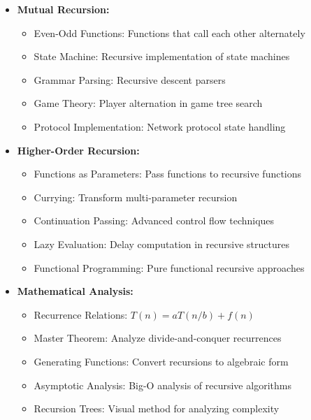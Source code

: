 \documentclass[a4paper,10pt]{book}
\begin{document}
\begin{itemize}[leftmargin=*]
    \item \textbf{Mutual Recursion:}
    \begin{itemize}
        \item Even-Odd Functions: Functions that call each other alternately
        \item State Machine: Recursive implementation of state machines
        \item Grammar Parsing: Recursive descent parsers
        \item Game Theory: Player alternation in game tree search
        \item Protocol Implementation: Network protocol state handling
    \end{itemize}

    \item \textbf{Higher-Order Recursion:}
    \begin{itemize}
        \item Functions as Parameters: Pass functions to recursive functions
        \item Currying: Transform multi-parameter recursion
        \item Continuation Passing: Advanced control flow techniques
        \item Lazy Evaluation: Delay computation in recursive structures
        \item Functional Programming: Pure functional recursive approaches
    \end{itemize}

    \item \textbf{Mathematical Analysis:}
    \begin{itemize}
        \item Recurrence Relations: $T(n)=aT(n/b)+f(n)$
        \item Master Theorem: Analyze divide-and-conquer recurrences
        \item Generating Functions: Convert recursions to algebraic form
        \item Asymptotic Analysis: Big-O analysis of recursive algorithms
        \item Recursion Trees: Visual method for analyzing complexity
    \end{itemize}
\end{itemize}
\end{document}
